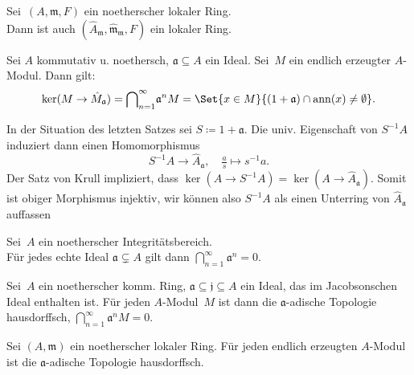 \documentclass{cheat-sheet}
\DeclareMathOperator{\ann}{ann} %
\newcommand{\aaa}{\mathfrak{a}}
\newcommand{\jjj}{\mathfrak{j}}
\newcommand{\mmm}{\mathfrak{m}}
\begin{document}
\begin{kor}
  \begin{minipage}[t]{0.8 \linewidth}
    Sei~$(A, \mmm, F)$ ein noetherscher lokaler Ring. \\
    Dann ist auch $(\hat{A}_\mmm, \hat{\mmm}_\mmm, F)$ ein lokaler Ring.
  \end{minipage}
\end{kor}


\begin{satz}
  Sei $A$ kommutativ u. noethersch, $\aaa \subseteq A$ ein Ideal.
  Sei~$M$ ein endlich erzeugter $A$-Modul.
  Dann gilt:
  \[
    \ker(M \to \hat{M}_\aaa) = {\bigcap}_{n=1}^\infty \aaa^n M = \Set{x \in M}{(1 + \aaa) \cap \ann(x) \neq \emptyset}.
  \]
\end{satz}

\begin{bem}
  In der Situation des letzten Satzes sei $S \coloneqq 1 + \aaa$.
  Die univ. Eigenschaft von $S^{-1} A$ induziert dann einen Homomorphismus
  \[
    S^{-1} A \to \hat{A}_\aaa, \quad
    \tfrac{a}{s} \mapsto s^{-1} a.
  \]
  Der Satz von Krull impliziert, dass $\ker(A \to S^{-1} A) = \ker(A \to \hat{A}_\aaa)$.
  Somit ist obiger Morphismus injektiv, wir können also $S^{-1} A$ als einen Unterring von $\hat{A}_\aaa$ auffassen
\end{bem}

\begin{kor}
  \begin{minipage}[t]{0.8 \linewidth}
    Sei~$A$ ein noetherscher Integritätsbereich. \\
    Für jedes echte Ideal $\aaa \subsetneq A$ gilt dann ${\bigcap}_{n=1}^\infty \aaa^n = 0$.
  \end{minipage}
\end{kor}

\begin{kor}
  Sei~$A$ ein noetherscher komm. Ring, $\aaa \subseteq \jjj \subseteq A$ ein Ideal, das im Jacobsonschen Ideal enthalten ist.
  Für jeden $A$-Modul~$M$ ist dann die $\aaa$-adische Topologie hausdorffsch, \dh{} ${\bigcap}_{n=1}^\infty \aaa^n M = 0$.
\end{kor}

\begin{kor}
  Sei $(A, \mmm)$ ein noetherscher lokaler Ring.
  Für jeden endlich erzeugten $A$-Modul ist die $\aaa$-adische Topologie hausdorffsch.
\end{kor}
\end{document}

